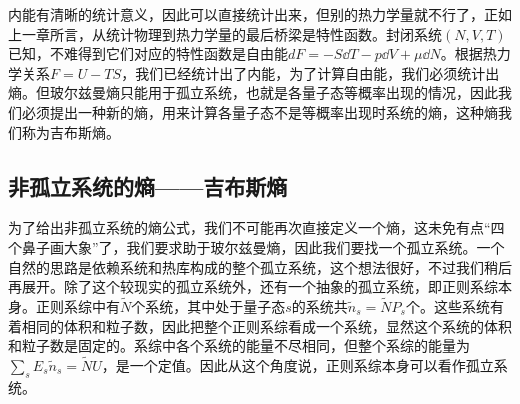\documentclass[../../main.tex]{subfiles}
\begin{document}
内能有清晰的统计意义，因此可以直接统计出来，但别的热力学量就不行了，正如上一章所言，从统计物理到热力学量的最后桥梁是特性函数。封闭系统\((N,V,T)\)已知，不难得到它们对应的特性函数是自由能\(dF=-S\dd T-p\dd V+\mu\dd N\)。根据热力学关系\(F=U-TS\)，我们已经统计出了内能，为了计算自由能，我们必须统计出熵。但玻尔兹曼熵只能用于孤立系统，也就是各量子态等概率出现的情况，因此我们必须提出一种新的熵，用来计算各量子态不是等概率出现时系统的熵，这种熵我们称为吉布斯熵。

\subsection{非孤立系统的熵——吉布斯熵}

为了给出非孤立系统的熵公式，我们不可能再次直接定义一个熵，这未免有点“四个鼻子画大象”了，我们要求助于玻尔兹曼熵，因此我们要找一个孤立系统。一个自然的思路是依赖系统和热库构成的整个孤立系统，这个想法很好，不过我们稍后再展开。除了这个较现实的孤立系统外，还有一个抽象的孤立系统，即正则系综本身。正则系综中有\(\tilde{N}\)个系统，其中处于量子态\(s\)的系统共\(\tilde{n}_s=\tilde{N}P_s\)个。这些系统有着相同的体积和粒子数，因此把整个正则系综看成一个系统，显然这个系统的体积和粒子数是固定的。系综中各个系统的能量不尽相同，但整个系综的能量为\(\sum_s E_s\tilde{n}_s=\tilde{N}U\)，是一个定值。因此从这个角度说，正则系综本身可以看作孤立系统。
\end{document}
